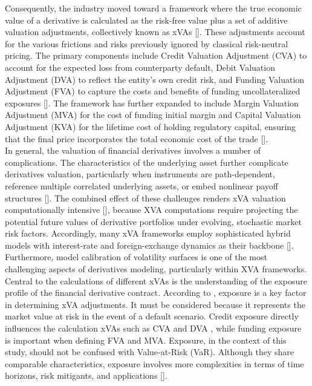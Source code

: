 \noindent
    Consequently, the industry moved toward a framework where the true economic value of a derivative is calculated as the risk-free value plus a set of additive valuation adjustments, collectively known as xVAs [\cite{Tsuchiya_2019}]. These adjustments account for the various frictions and risks previously ignored by classical risk-neutral pricing. The primary components include Credit Valuation Adjustment (CVA) to account for the expected loss from counterparty default, Debit Valuation Adjustment (DVA) to reflect the entity's own credit risk, and Funding Valuation Adjustment (FVA) to capture the costs and benefits of funding uncollateralized exposures [\cite{Gregory_2015}]. The framework has further expanded to include Margin Valuation Adjustment (MVA) for the cost of funding initial margin and Capital Valuation Adjustment (KVA) for the lifetime cost of holding regulatory capital, ensuring that the final price incorporates the total economic cost of the trade [\cite{Green_2016}].\\

\noindent
    In general, the valuation of financial derivatives involves a number of complications. The characteristics of the underlying asset further complicate derivatives valuation, particularly when instruments are path-dependent, reference multiple correlated underlying assets, or embed nonlinear payoff structures [\cite{KPMG2025DerivValuation}]. The combined effect of these challenges renders xVA valuation computationally intensive [\cite{Tsuchiya_2019}], because XVA computations require projecting the potential future values of derivative portfolios under evolving, stochastic market risk factors. Accordingly, many xVA frameworks employ sophisticated hybrid models with interest-rate and foreign-exchange dynamics as their backbone [\cite{Tsuchiya_2019}]. Furthermore, model calibration of volatility surfaces is one of the most challenging aspects of derivatives modeling, particularly within XVA frameworks.\\

\noindent
    Central to the calculations of different xVAs is the understanding of the exposure profile of the financial derivative contract. According to \citet{Gregory_2015}, exposure is a key factor in determining xVA adjustments. It must be considered because it represents the market value at risk in the event of a default scenario. Credit exposure directly influences the calculation xVAs such as CVA and DVA , while funding exposure is important when defining FVA and MVA. Exposure, in the context of this study, should not be confused with Value-at-Risk (VaR). Although they share comparable characteristics, exposure involves more complexities in terms of time horizons, risk mitigants, and applications [\cite{Gregory_2015}]. \\

